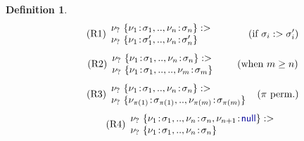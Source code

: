 \documentclass[10pt,preprint,blind,clearpagebib]{sigplanconf}
\newcommand{\kvd}[1]{\textnormal{\textcolor{kvdclr}{\sffamily #1}}}
\newtheorem{definition}{Definition}
\begin{document}
\begin{definition}
\noindent
\begin{align}
\label{eq:sub-record1}\tag{R1}
\begin{array}{l}
 \nu_?~\{ \nu_1\!:\!\sigma_1, .., \nu_n\!:\!\sigma_n \} :> \\
 \nu_?~\{ \nu_1\!:\!\sigma_1', .., \nu_n\!:\!\sigma_n' \}
\end{array} \qquad ~~~~(\textnormal{if}~\sigma_i :> \sigma_i')
\end{align}
\vspace{-0.8em}
\begin{align}
\label{eq:sub-record2}\tag{R2}
\begin{array}{l}
 \nu_?~\{ \nu_1\!:\!\sigma_1, .., \nu_n\!:\!\sigma_n \} :> \\
 \nu_?~\{ \nu_1\!:\!\sigma_1, .., .., \nu_m\!:\!\sigma_m \}
\end{array} \qquad (\textnormal{when}~m \geq n)
\end{align}
\vspace{-0.8em}
\begin{align}
\label{eq:sub-record3}\tag{R3}
\begin{array}{l}
 \nu_?~\{ \nu_1\!:\!\sigma_1, .., \nu_n\!:\!\sigma_n \} :> \\
 \nu_?~\{ \nu_{\pi(1)}\!:\!\sigma_{\pi(1)}, .., \nu_{\pi(m)}\!:\!\sigma_{\pi(m)} \}
\end{array} ~~(\pi~\textnormal{perm.})
\end{align}
\vspace{-0.8em}
\begin{align}
\label{eq:sub-record4}\tag{R4}
\begin{array}{l}
 \nu_?~\{ \nu_1\!:\!\sigma_1, .., \nu_n\!:\!\sigma_n, \nu_{n+1}\!:\!\kvd{null} \} :> \\
 \nu_?~\{ \nu_1\!:\!\sigma_1, .., \nu_n\!:\!\sigma_n \}
\end{array}
\end{align}
\end{definition}

\end{document}
